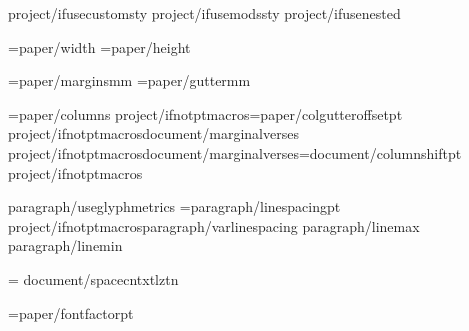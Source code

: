 


{project/ifusecustomsty}
{project/ifusemodssty} %
{project/ifusenested}     %

\PaperWidth={paper/width}
\PaperHeight={paper/height}

\MarginUnit={paper/margins}mm
\def\TopMarginFactor{{{paper/topmarginfactor}}}
\def\BottomMarginFactor{{{paper/bottommarginfactor}}}
\def\SideMarginFactor{{{paper/sidemarginfactor}}}
\BindingGutter={paper/gutter}mm

\BodyColumns={paper/columns}
\def\ColumnGutterFactor{{{document/colgutterfactor}}}
{project/ifnotptmacros}\ColumnGutterRuleSkip={paper/colgutteroffset}pt
{project/ifnotptmacros}{document/marginalverses}
{project/ifnotptmacros}{document/marginalverses}\columnshift={document/columnshift}pt
{project/ifnotptmacros}

\def\LineSpacingFactor{{{paragraph/linespacingfactor}}}
\def\VerticalSpaceFactor{{1.0}}
{paragraph/useglyphmetrics}
\baselineskip={paragraph/linespacing}pt {project/ifnotptmacros}{paragraph/varlinespacing} {paragraph/linemax} {paragraph/linemin}

\XeTeXinterwordspaceshaping = {document/spacecntxtlztn}

\FontSizeUnit={paper/fontfactor}pt
\def\regular{{"{fontregular/name}{font/features}{document/script}{document/digitmapping}"}}
\def\bold{{"{fontbold/name}{font/features}{document/script}{document/digitmapping}{fontbold/embolden}{fontbold/slant}"}}
\def\italic{{"{fontitalic/name}{font/features}{document/script}{document/digitmapping}{fontitalic/embolden}{fontitalic/slant}"}}
\def\bolditalic{{"{fontbolditalic/name}{font/features}{document/script}{document/digitmapping}{fontbolditalic/embolden}{fontbolditalic/slant}"}}

